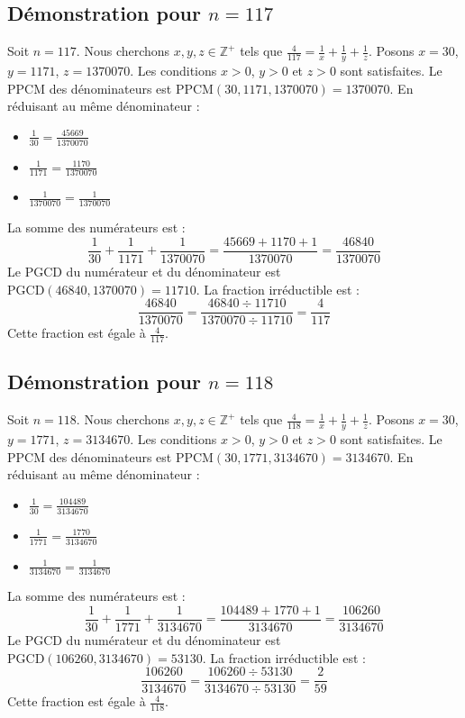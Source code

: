 \documentclass[11pt,a4paper]{article}
\begin{document}
\subsection{Démonstration pour $n = 117$}
Soit $n = 117$. Nous cherchons $x, y, z \in \mathbb{Z}^{+}$ tels que $\frac{4}{117} = \frac{1}{x} + \frac{1}{y} + \frac{1}{z}$.
Posons $x = 30$, $y = 1171$, $z = 1370070$.
Les conditions $x > 0$, $y > 0$ et $z > 0$ sont satisfaites.
Le PPCM des dénominateurs est $\text{PPCM}(30, 1171, 1370070) = 1370070$.
En réduisant au même dénominateur :
\begin{itemize}
    \item $\frac{1}{30} = \frac{45669}{1370070}$
    \item $\frac{1}{1171} = \frac{1170}{1370070}$
    \item $\frac{1}{1370070} = \frac{1}{1370070}$
\end{itemize}
La somme des numérateurs est :
$$ \frac{1}{30} + \frac{1}{1171} + \frac{1}{1370070} = \frac{45669 + 1170 + 1}{1370070} = \frac{46840}{1370070} $$
Le PGCD du numérateur et du dénominateur est $\text{PGCD}(46840, 1370070) = 11710$.
La fraction irréductible est :
$$ \frac{46840}{1370070} = \frac{46840 \div 11710}{1370070 \div 11710} = \frac{4}{117} $$
Cette fraction est égale à $\frac{4}{117}$.

\subsection{Démonstration pour $n = 118$}
Soit $n = 118$. Nous cherchons $x, y, z \in \mathbb{Z}^{+}$ tels que $\frac{4}{118} = \frac{1}{x} + \frac{1}{y} + \frac{1}{z}$.
Posons $x = 30$, $y = 1771$, $z = 3134670$.
Les conditions $x > 0$, $y > 0$ et $z > 0$ sont satisfaites.
Le PPCM des dénominateurs est $\text{PPCM}(30, 1771, 3134670) = 3134670$.
En réduisant au même dénominateur :
\begin{itemize}
    \item $\frac{1}{30} = \frac{104489}{3134670}$
    \item $\frac{1}{1771} = \frac{1770}{3134670}$
    \item $\frac{1}{3134670} = \frac{1}{3134670}$
\end{itemize}
La somme des numérateurs est :
$$ \frac{1}{30} + \frac{1}{1771} + \frac{1}{3134670} = \frac{104489 + 1770 + 1}{3134670} = \frac{106260}{3134670} $$
Le PGCD du numérateur et du dénominateur est $\text{PGCD}(106260, 3134670) = 53130$.
La fraction irréductible est :
$$ \frac{106260}{3134670} = \frac{106260 \div 53130}{3134670 \div 53130} = \frac{2}{59} $$
Cette fraction est égale à $\frac{4}{118}$.
\end{document}
